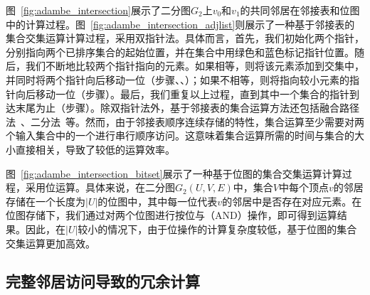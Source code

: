 \begin{example}
	
	图~\ref{fig:adambe_intersection}展示了二分图$G_2$上$v_0$和$v_1$的共同邻居在邻接表和位图中的计算过程。图~\ref{fig:adambe_intersection_adjlist}则展示了一种基于邻接表的集合交集运算计算过程，采用双指针法。具体而言，首先，我们初始化两个指针，分别指向两个已排序集合的起始位置，并在集合中用绿色和蓝色标记指针位置。随后，我们不断地比较两个指针指向的元素。如果相等，则将该元素添加到交集中，并同时将两个指针向后移动一位（步骤、、）；如果不相等，则将指向较小元素的指针向后移动一位（步骤）。最后，我们重复以上过程，直到其中一个集合的指针到达末尾为止（步骤）。除双指针法外，基于邻接表的集合运算方法还包括融合路径法~\cite{GpuMergePathIntersect14,MergePath18}、二分法~\cite{BinaryIntersect18,triangle18}等。然而，由于邻接表顺序连续存储的特性，集合运算至少需要对两个输入集合中的一个进行串行顺序访问。这意味着集合运算所需的时间与集合的大小直接相关，导致了较低的运算效率。
	
	图~\ref{fig:adambe_intersection_bitset}展示了一种基于位图的集合交集运算计算过程，采用位运算。具体来说，在二分图$G_2(U,V,E)$中，集合$V$中每个顶点$v$的邻居存储在一个长度为$|U|$的位图中，其中每一位代表$v$的邻居中是否存在对应元素。在位图存储下，我们通过对两个位图进行按位与（AND）操作，即可得到运算结果。因此，在$|U|$较小的情况下，由于位操作的计算复杂度较低，基于位图的集合交集运算更加高效。

\end{example}






\subsection{完整邻居访问导致的冗余计算}
\label{subsec:ada_limitation}

